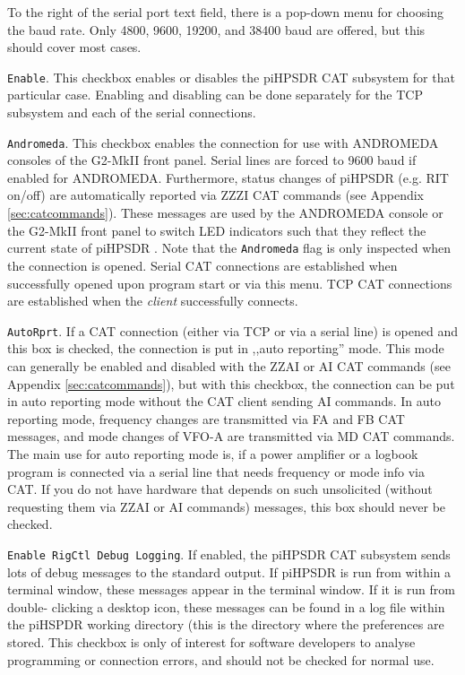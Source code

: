 \documentclass[12pt]{book}
\def\rett#1{\texttt{\color{red}#1}}
\def\pH{pi\-HPSDR }
\begin{document}
To the right of the serial port text field, there is a pop-down menu for choosing the baud rate. Only 4800,
9600, 19200, and 38400 baud are offered, but this should cover most cases.

\rett{Enable}. This checkbox enables or disables the \pH CAT subsystem for that particular case.
Enabling and disabling can be done separately for the TCP subsystem and each of the serial
connections.

\rett{Andromeda}. This checkbox enables the connection for use with ANDROMEDA consoles
of the G2-MkII front panel. Serial lines are
forced to 9600 baud if enabled for ANDROMEDA. Furthermore, status changes of \pH (e.g. RIT on/off) are
automatically reported via ZZZI CAT commands (see Appendix \ref{sec:catcommands}). These messages are
used by the ANDROMEDA console or the G2-MkII front panel
to switch LED indicators such that they reflect the current state
of \pH. Note that the \rett{Andromeda} flag is only inspected when the connection is opened. Serial CAT connections
are established when successfully opened upon program start or via this menu.
TCP CAT connections are established when the \textit{client} successfully connects.

\rett{AutoRprt}. If a CAT connection (either via TCP or via a serial line) is opened and this box is checked,
the connection is put in ,,auto reporting'' mode. This mode can generally be enabled and disabled with the
ZZAI or AI CAT commands (see Appendix \ref{sec:catcommands}), but with this checkbox, the connection can be put
in auto reporting mode without the CAT client sending AI commands. In auto reporting mode, frequency changes
are transmitted via FA and FB CAT messages, and mode changes of VFO-A are transmitted via MD CAT commands.
The main use for auto reporting mode is, if a power amplifier or a logbook program
is connected via a serial line that needs frequency or mode  info via CAT. If you do not have hardware that depends
on such unsolicited (without requesting them via ZZAI or AI commands) messages, this box should never be checked.

\rett{Enable RigCtl Debug Logging}. If enabled, the \pH CAT subsystem sends lots of debug messages to the standard output. If
\pH is run
from within a terminal window, these messages appear in the terminal window. If it is run from double-
clicking a desktop icon,
these messages can be found in a log file within the piHSPDR working directory (this is the directory where
the preferences
are stored. This checkbox is only of interest for software developers to analyse programming or connection
errors, and should
not be checked for normal use.
\end{document}
